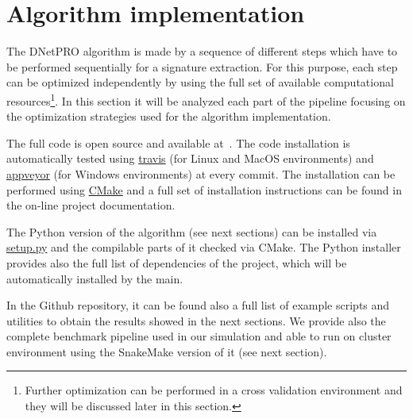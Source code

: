 \documentclass{standalone}
\begin{document}
\section[DNetPRO Implementation]{Algorithm implementation}\label{implementation:implementation}

The \textsf{DNetPRO} algorithm is made by a sequence of different steps which have to be performed sequentially for a signature extraction.
For this purpose, each step can be optimized independently by using the full set of available computational resources\footnote{
Further optimization can be performed in a cross validation environment and they will be discussed later in this section.
}.
In this section it will be analyzed each part of the pipeline focusing on the optimization strategies used for the algorithm implementation.

The full code is open source and available at~\cite{DNetPRO}.
The code installation is automatically tested using \href{https://github.com/Nico-Curti/DNetPRO/blob/master/.travis.yml
}{\textsf{travis}} (for Linux and MacOS environments) and \href{https://github.com/Nico-Curti/DNetPRO/blob/master/appveyor.yml}{\textsf{appveyor}} (for Windows environments) at every commit.
The installation can be performed using \href{https://github.com/Nico-Curti/DNetPRO/blob/master/CMakeLists.txt}{\textsf{CMake}} and a full set of installation instructions can be found in the on-line project documentation.

The \textsf{Python} version of the algorithm (see next sections) can be installed via \href{https://github.com/Nico-Curti/DNetPRO/blob/master/setup.py}{\textsf{setup.py}} and the compilable parts of it checked via \textsf{CMake}.
The \textsf{Python} installer provides also the full list of dependencies of the project, which will be automatically installed by the main.

In the Github repository, it can be found also a full list of example scripts and utilities to obtain the results showed in the next sections.
We provide also the complete benchmark pipeline used in our simulation and able to run on cluster environment using the \textsf{SnakeMake} version of it (see next section).
\end{document}
